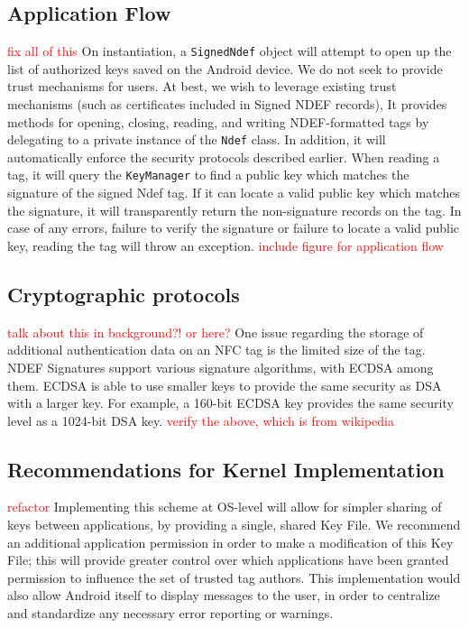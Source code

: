 \documentclass[12pt]{article}
\newcommand\TODO[1]{\textcolor{red}{#1}}
\newcommand\todo[1]{\textcolor{red}{#1}}
\begin{document}
\subsection{Application Flow}
\todo{fix all of this}
On instantiation, a \texttt{SignedNdef} object will attempt to open up the list of authorized keys saved on the Android device.
We do not seek to provide trust mechanisms for users.
At best, we wish to leverage existing trust mechanisms (such as certificates included in Signed NDEF records), 
It provides methods for opening, closing, reading, and writing NDEF-formatted tags by delegating to a private instance of the \texttt{Ndef} class.
In addition, it will automatically enforce the security protocols described earlier.
When reading a tag, it will query the \texttt{KeyManager} to find a public key which matches the signature of the signed Ndef tag.
If it can locate a valid public key which matches the signature, it will transparently return the non-signature records on the tag.
In case of any errors, failure to verify the signature or failure to locate a valid public key, reading the tag will throw an exception.
\TODO{include figure for application flow}

\subsection{Cryptographic protocols}
\todo{talk about this in background?! or here?}
One issue regarding the storage of additional authentication data on an NFC tag is the limited size of the tag.
NDEF Signatures support various signature algorithms, with ECDSA among them.
ECDSA is able to use smaller keys to provide the same security as DSA with a larger key.
For example, a 160-bit ECDSA key provides the same security level as a 1024-bit DSA key.
\TODO{verify the above, which is from wikipedia}

\subsection{Recommendations for Kernel Implementation}
\todo{refactor}
Implementing this scheme at OS-level will allow for simpler sharing of keys between applications, by providing a single, shared Key File.
We recommend an additional application permission in order to make a modification of this Key File; this will provide greater control over which applications have been granted permission to influence the set of trusted tag authors.
This implementation would also allow Android itself to display messages to the user, in order to centralize and standardize any necessary error reporting or warnings.
\end{document}
